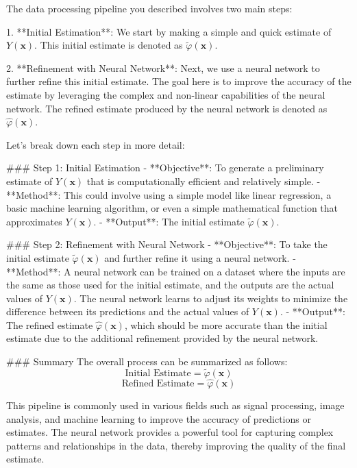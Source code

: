 The data processing pipeline you described involves two main steps:

1. **Initial Estimation**: We start by making a simple and quick estimate of \( Y(\mathbf{x}) \). This initial estimate is denoted as \( \tilde{\varphi}(\mathbf{x}) \).

2. **Refinement with Neural Network**: Next, we use a neural network to further refine this initial estimate. The goal here is to improve the accuracy of the estimate by leveraging the complex and non-linear capabilities of the neural network. The refined estimate produced by the neural network is denoted as \( \hat{\varphi}(\mathbf{x}) \).

Let's break down each step in more detail:

### Step 1: Initial Estimation
- **Objective**: To generate a preliminary estimate of \( Y(\mathbf{x}) \) that is computationally efficient and relatively simple.
- **Method**: This could involve using a simple model like linear regression, a basic machine learning algorithm, or even a simple mathematical function that approximates \( Y(\mathbf{x}) \).
- **Output**: The initial estimate \( \tilde{\varphi}(\mathbf{x}) \).

### Step 2: Refinement with Neural Network
- **Objective**: To take the initial estimate \( \tilde{\varphi}(\mathbf{x}) \) and further refine it using a neural network.
- **Method**: A neural network can be trained on a dataset where the inputs are the same as those used for the initial estimate, and the outputs are the actual values of \( Y(\mathbf{x}) \). The neural network learns to adjust its weights to minimize the difference between its predictions and the actual values of \( Y(\mathbf{x}) \).
- **Output**: The refined estimate \( \hat{\varphi}(\mathbf{x}) \), which should be more accurate than the initial estimate due to the additional refinement provided by the neural network.

### Summary
The overall process can be summarized as follows:
\[ \text{Initial Estimate} = \tilde{\varphi}(\mathbf{x}) \]
\[ \text{Refined Estimate} = \hat{\varphi}(\mathbf{x}) \]

This pipeline is commonly used in various fields such as signal processing, image analysis, and machine learning to improve the accuracy of predictions or estimates. The neural network provides a powerful tool for capturing complex patterns and relationships in the data, thereby improving the quality of the final estimate.